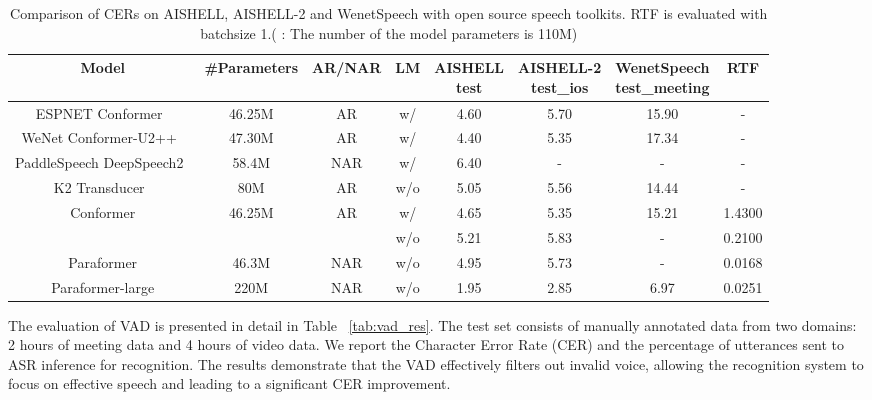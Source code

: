 \documentclass{INTERSPEECH2023}
\begin{document}
\begin{table*}[h]
    \vspace{-3mm}
    \centering
    \caption{Comparison of CERs on AISHELL, AISHELL-2 and WenetSpeech with open source speech toolkits. RTF is evaluated with batchsize 1.( : The number of the model parameters is 110M) }
    \vspace{-2mm}
    \begin{tabular}{c|ccccccc}
        \midrule
        Model & \#Parameters & AR/NAR & LM  & \makecell[c]{AISHELL\\ test} & \makecell[c]{AISHELL-2 \\ test\_ios} & \makecell[c]{WenetSpeech \\ test\_meeting} & RTF \\
        \midrule
        ESPNET Conformer~\cite{watanabe2018espnet} & 46.25M & AR &w/ & 4.60 & 5.70 & 15.90  & - \\
        WeNet Conformer-U2++~\cite{zhang2022wenet} & 47.30M & AR &w/ & 4.40 & 5.35 & 17.34  & -\\
        PaddleSpeech DeepSpeech2~\cite{zhang2022paddlespeech} & 58.4M & NAR &w/& 6.40 & - & - &- \\
        K2 Transducer~\cite{kang2022fast} & 80M & AR &w/o& 5.05 & 5.56 & 14.44  & - \\
        \hline
        \multirow{2}{*}{Conformer} & \multirow{2}{*}{46.25M} & \multirow{2}{*}{AR} &w/& 4.65 & 5.35 & 15.21 & 1.4300 \\
         &  &  &w/o& 5.21 & 5.83  & - & 0.2100 \\
        Paraformer & 46.3M & NAR &w/o& 4.95 & 5.73 & - & 0.0168\\
        Paraformer-large & 220M & NAR &w/o& 1.95 & 2.85& 6.97 & 0.0251 \\
        \midrule
    \end{tabular}
    \label{tab:paraformer_res}
    \vspace{-5mm}
\end{table*}


The evaluation of VAD is presented in detail in Table ~\ref{tab:vad_res}. The test set consists of manually annotated data from two domains: 2 hours of meeting data and 4 hours of video data. We report the Character Error Rate (CER) and the percentage of utterances sent to ASR inference for recognition. The results demonstrate that the VAD effectively filters out invalid voice, allowing the recognition system to focus on effective speech and leading to a significant CER improvement.
\end{document}
